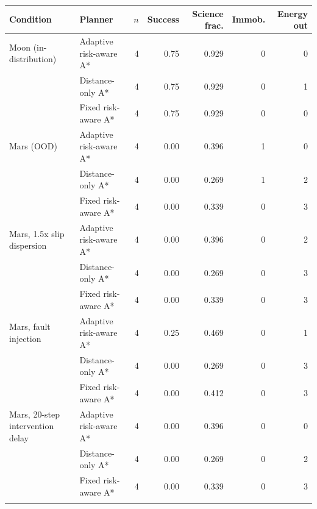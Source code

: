 \begin{tabular}{llrrrrr}
\toprule
Condition & Planner & $n$ & Success & Science frac. & Immob. & Energy out \\
\midrule
Moon (in-distribution) & Adaptive risk-aware A* & 4 & 0.75 & 0.929 & 0 & 0 \\
 & Distance-only A* & 4 & 0.75 & 0.929 & 0 & 1 \\
 & Fixed risk-aware A* & 4 & 0.75 & 0.929 & 0 & 0 \\
\addlinespace
Mars (OOD) & Adaptive risk-aware A* & 4 & 0.00 & 0.396 & 1 & 0 \\
 & Distance-only A* & 4 & 0.00 & 0.269 & 1 & 2 \\
 & Fixed risk-aware A* & 4 & 0.00 & 0.339 & 0 & 3 \\
\addlinespace
Mars, 1.5x slip dispersion & Adaptive risk-aware A* & 4 & 0.00 & 0.396 & 0 & 2 \\
 & Distance-only A* & 4 & 0.00 & 0.269 & 0 & 3 \\
 & Fixed risk-aware A* & 4 & 0.00 & 0.339 & 0 & 3 \\
\addlinespace
Mars, fault injection & Adaptive risk-aware A* & 4 & 0.25 & 0.469 & 0 & 1 \\
 & Distance-only A* & 4 & 0.00 & 0.269 & 0 & 3 \\
 & Fixed risk-aware A* & 4 & 0.00 & 0.412 & 0 & 3 \\
\addlinespace
Mars, 20-step intervention delay & Adaptive risk-aware A* & 4 & 0.00 & 0.396 & 0 & 0 \\
 & Distance-only A* & 4 & 0.00 & 0.269 & 0 & 2 \\
 & Fixed risk-aware A* & 4 & 0.00 & 0.339 & 0 & 3 \\
\addlinespace
\bottomrule
\end{tabular}

